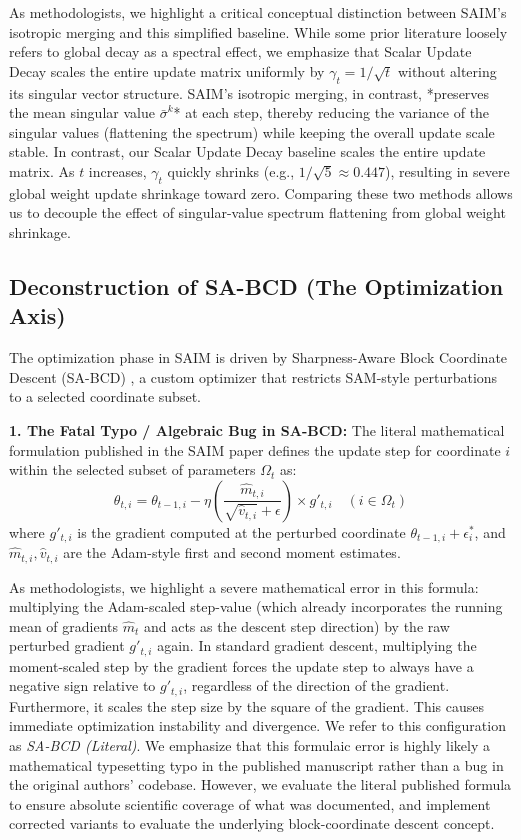 As methodologists, we highlight a critical conceptual distinction between SAIM's isotropic merging and this simplified baseline. While some prior literature loosely refers to global decay as a spectral effect, we emphasize that Scalar Update Decay scales the entire update matrix uniformly by $\gamma_t = 1/\sqrt{t}$ without altering its singular vector structure. SAIM's isotropic merging, in contrast, *preserves the mean singular value $\bar{\sigma}^k$* at each step, thereby reducing the variance of the singular values (flattening the spectrum) while keeping the overall update scale stable. In contrast, our Scalar Update Decay baseline scales the entire update matrix. As $t$ increases, $\gamma_t$ quickly shrinks (e.g., $1/\sqrt{5} \approx 0.447$), resulting in severe global weight update shrinkage toward zero. Comparing these two methods allows us to decouple the effect of singular-value spectrum flattening from global weight shrinkage.

\subsection{Deconstruction of SA-BCD (The Optimization Axis)}
The optimization phase in SAIM is driven by Sharpness-Aware Block Coordinate Descent (SA-BCD) \cite{saim2026}, a custom optimizer that restricts SAM-style perturbations to a selected coordinate subset.

\textbf{1. The Fatal Typo / Algebraic Bug in SA-BCD:} The literal mathematical formulation published in the SAIM paper defines the update step for coordinate $i$ within the selected subset of parameters $\Omega_t$ as:
\begin{equation}
  \theta_{t, i} = \theta_{t-1, i} - \eta \left(\frac{\hat{m}_{t, i}}{\sqrt{\hat{v}_{t, i}} + \epsilon}\right) \times g'_{t, i} \quad (i \in \Omega_t)
\end{equation}
where $g'_{t, i}$ is the gradient computed at the perturbed coordinate $\theta_{t-1, i} + \epsilon^*_i$, and $\hat{m}_{t,i}, \hat{v}_{t,i}$ are the Adam-style first and second moment estimates.

As methodologists, we highlight a severe mathematical error in this formula: multiplying the Adam-scaled step-value (which already incorporates the running mean of gradients $\hat{m}_t$ and acts as the descent step direction) by the raw perturbed gradient $g'_{t, i}$ again. In standard gradient descent, multiplying the moment-scaled step by the gradient forces the update step to always have a negative sign relative to $g'_{t,i}$, regardless of the direction of the gradient. Furthermore, it scales the step size by the square of the gradient. This causes immediate optimization instability and divergence. We refer to this configuration as \emph{SA-BCD (Literal)}. We emphasize that this formulaic error is highly likely a mathematical typesetting typo in the published manuscript rather than a bug in the original authors' codebase. However, we evaluate the literal published formula to ensure absolute scientific coverage of what was documented, and implement corrected variants to evaluate the underlying block-coordinate descent concept.

